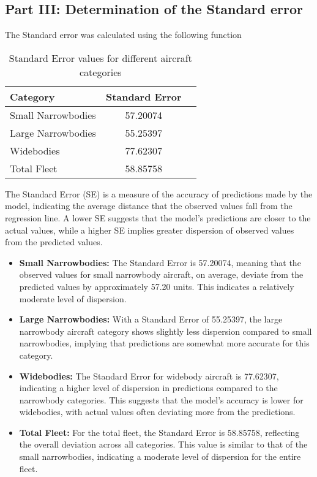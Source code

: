 \subsection{Part III: Determination of  the Standard error }

The Standard error was calculated using the following function



\begin{table}[h!]
    \centering
    \begin{tabular}{lcc}
        \toprule
        Category           & Standard Error \\
        \midrule
        Small Narrowbodies & 57.20074       \\
        Large Narrowbodies & 55.25397       \\
        Widebodies         & 77.62307       \\
        Total Fleet        & 58.85758       \\
        \bottomrule
    \end{tabular}
    \caption{Standard Error values for different aircraft categories}
    \label{tab:rsquared_se}
\end{table}

The Standard Error (SE) is a measure of the accuracy of predictions made by the model, indicating the average distance that the observed values fall from the regression line. A lower SE suggests that the model’s predictions are closer to the actual values, while a higher SE implies greater dispersion of observed values from the predicted values.

\begin{itemize}
    \item \textbf{Small Narrowbodies:} The Standard Error is 57.20074, meaning that the observed values for small narrowbody aircraft, on average, deviate from the predicted values by approximately 57.20 units. This indicates a relatively moderate level of dispersion.

    \item \textbf{Large Narrowbodies:} With a Standard Error of 55.25397, the large narrowbody aircraft category shows slightly less dispersion compared to small narrowbodies, implying that predictions are somewhat more accurate for this category.

    \item \textbf{Widebodies:} The Standard Error for widebody aircraft is 77.62307, indicating a higher level of dispersion in predictions compared to the narrowbody categories. This suggests that the model's accuracy is lower for widebodies, with actual values often deviating more from the predictions.

    \item \textbf{Total Fleet:} For the total fleet, the Standard Error is 58.85758, reflecting the overall deviation across all categories. This value is similar to that of the small narrowbodies, indicating a moderate level of dispersion for the entire fleet.

\end{itemize}